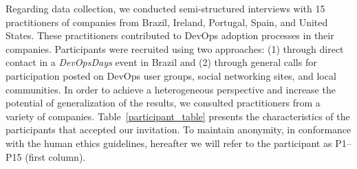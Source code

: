 

Regarding data collection, we conducted semi-structured interviews with 15 practitioners of companies from
Brazil, Ireland, Portugal, Spain, and United States. These practitioners
contributed to DevOps adoption processes in their companies. Participants
were recruited using two approaches: (1) through direct contact in a \emph{DevOpsDays}
event in Brazil and (2) through  general
calls for participation posted on DevOps user groups, social networking sites,
and local communities. In order to achieve a heterogeneous perspective
and increase the potential of generalization of the results,
we consulted practitioners from a variety of companies.
Table~\ref{participant_table} presents the characteristics of the participants
that accepted our invitation.
To maintain anonymity, in conformance with the human ethics guidelines,
hereafter we will refer to the participant as P1--P15 (first column).


